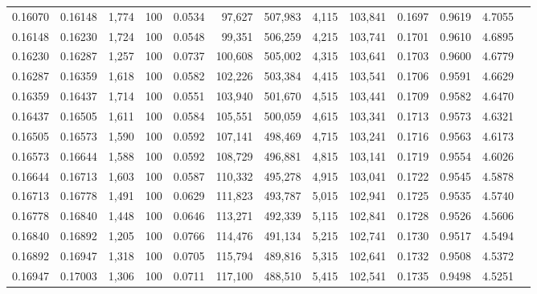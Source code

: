 \begin{tabular}{rrrrrrrrrrrrr}
0.16070 & 0.16148 & 1,774 & 100 &                                     0.0534 &  97,627 & 507,983 &   4,115 & 103,841 & 0.1697 & 0.9619 & 4.7055 \\
0.16148 & 0.16230 & 1,724 & 100 &                                     0.0548 &  99,351 & 506,259 &   4,215 & 103,741 & 0.1701 & 0.9610 & 4.6895 \\
0.16230 & 0.16287 & 1,257 & 100 &                                     0.0737 & 100,608 & 505,002 &   4,315 & 103,641 & 0.1703 & 0.9600 & 4.6779 \\
0.16287 & 0.16359 & 1,618 & 100 &                                     0.0582 & 102,226 & 503,384 &   4,415 & 103,541 & 0.1706 & 0.9591 & 4.6629 \\
0.16359 & 0.16437 & 1,714 & 100 &                                     0.0551 & 103,940 & 501,670 &   4,515 & 103,441 & 0.1709 & 0.9582 & 4.6470 \\
0.16437 & 0.16505 & 1,611 & 100 &                                     0.0584 & 105,551 & 500,059 &   4,615 & 103,341 & 0.1713 & 0.9573 & 4.6321 \\
0.16505 & 0.16573 & 1,590 & 100 &                                     0.0592 & 107,141 & 498,469 &   4,715 & 103,241 & 0.1716 & 0.9563 & 4.6173 \\
0.16573 & 0.16644 & 1,588 & 100 &                                     0.0592 & 108,729 & 496,881 &   4,815 & 103,141 & 0.1719 & 0.9554 & 4.6026 \\
0.16644 & 0.16713 & 1,603 & 100 &                                     0.0587 & 110,332 & 495,278 &   4,915 & 103,041 & 0.1722 & 0.9545 & 4.5878 \\
0.16713 & 0.16778 & 1,491 & 100 &                                     0.0629 & 111,823 & 493,787 &   5,015 & 102,941 & 0.1725 & 0.9535 & 4.5740 \\
0.16778 & 0.16840 & 1,448 & 100 &                                     0.0646 & 113,271 & 492,339 &   5,115 & 102,841 & 0.1728 & 0.9526 & 4.5606 \\
0.16840 & 0.16892 & 1,205 & 100 &                                     0.0766 & 114,476 & 491,134 &   5,215 & 102,741 & 0.1730 & 0.9517 & 4.5494 \\
0.16892 & 0.16947 & 1,318 & 100 &                                     0.0705 & 115,794 & 489,816 &   5,315 & 102,641 & 0.1732 & 0.9508 & 4.5372 \\
0.16947 & 0.17003 & 1,306 & 100 &                                     0.0711 & 117,100 & 488,510 &   5,415 & 102,541 & 0.1735 & 0.9498 & 4.5251 \\

\end{tabular}
